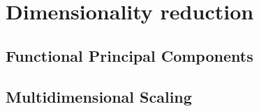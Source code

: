 \chapter{Dimensionality reduction}

\section{Functional Principal Components}
\section{Multidimensional Scaling}
